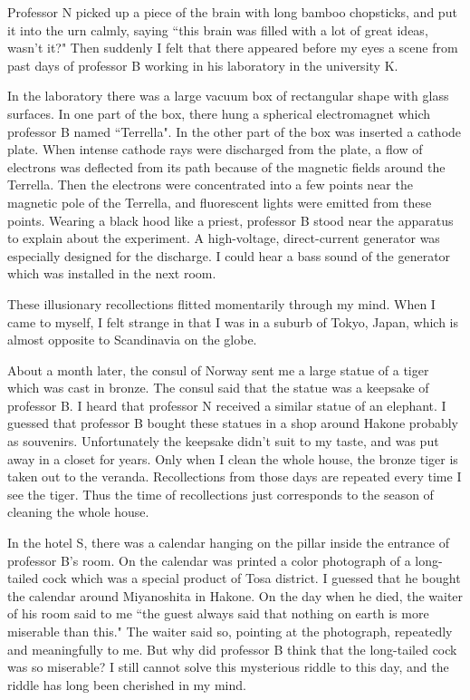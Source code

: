 \documentclass[11pt,a4j,twocolumn]{jarticle}
\begin{document}
Professor N picked up a piece of the brain with long bamboo chopsticks,
and put it into the urn calmly, saying ``this brain was
filled with a lot of great ideas, wasn't it?"
Then suddenly I felt that there appeared before my eyes 
a scene from past days of professor B 
working in his laboratory in the university K.

In the laboratory there was a large vacuum box of rectangular shape 
with glass surfaces. In one part of the box, there hung
a spherical electromagnet which professor B named ``Terrella".
In the other part of the box was inserted a cathode plate.
When intense cathode rays were discharged from the plate,
a flow of electrons was deflected from its path
because of the magnetic fields around the Terrella.
Then the electrons were concentrated into a few points
near the magnetic pole of the Terrella, and
fluorescent lights were emitted from these points.
Wearing a black hood like a priest, professor B
stood near the apparatus to explain about the experiment.
A high-voltage, direct-current generator was especially designed for 
the discharge. I could hear a bass sound of the generator
which was installed in the next room.

These illusionary recollections flitted momentarily through my mind.
When I came to myself, I felt strange in that I was in a suburb of 
Tokyo, Japan, which is almost opposite to Scandinavia on the globe.

About a month later, the consul of Norway sent me 
a large statue of a tiger which was cast in bronze.
The consul said that the statue was a keepsake of professor B.
I heard that professor N received a similar statue of an elephant.
I guessed that professor B bought these statues in a shop
around Hakone probably as souvenirs. Unfortunately the keepsake
didn't suit to my taste, and was put away in a closet for years.
Only when I clean the whole house, 
the bronze tiger is taken out to the veranda.
Recollections from those days are repeated every time I see the tiger.
Thus the time of recollections just corresponds to
the season of cleaning the whole house.

In the hotel S, there was a calendar hanging on the pillar inside
the entrance of professor B's room.
On the calendar was printed a color photograph of a long-tailed cock
which was a special product of Tosa district.
I guessed that he bought the calendar around Miyanoshita in Hakone.
On the day when he died, the waiter of his room said to me
``the guest always said that nothing on earth is more miserable than this."
The waiter said so, pointing at the photograph,
repeatedly and meaningfully to me.
But why did professor B think that the long-tailed cock was so miserable?
I still cannot solve this mysterious riddle to this day,
and the riddle has long been cherished in my mind.
\end{document}
